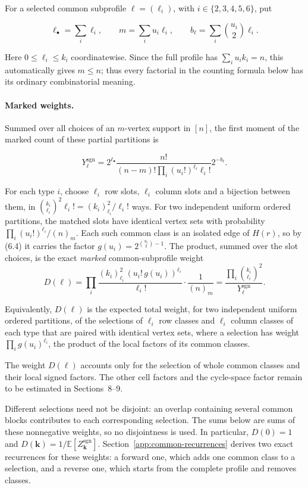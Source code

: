 \documentclass[a4paper,10pt,reqno]{amsart}
\numberwithin{equation}{section}
\newcommand{\Exp}[1]{\mathbb{E}\!\left[#1\right]}
\theoremstyle{plain}
\theoremstyle{remark}
\begin{document}
For a selected common subprofile \(\ell=(\ell_i)\), with
$i\in\{2,3,4,5,6\}$, put

\[
 \ell_\bullet=\sum_i\ell_i,\qquad
 m=\sum_i u_i\ell_i,\qquad
 b_\ell=\sum_i\binom{u_i}{2}\ell_i.                           \tag{7.1}
\]

Here \(0\le\ell_i\le k_i\) coordinatewise.  Since the full profile has
\(\sum_i u_i k_i=n\), this automatically gives \(m\le n\); thus every
factorial in the counting formula below has its ordinary combinatorial
meaning.

\paragraph{Marked weights.}
Summed over all choices of an $m$-vertex support in $[n]$, the first moment of the marked count of these partial partitions is

\[
 Y_{\ell}^{\mathrm{sgn}}
 =2^{\ell_\bullet}\frac{n!}{(n-m)!\prod_i(u_i!)^{\ell_i}\ell_i!}
       2^{-b_\ell}.                                           \tag{7.2}
\]

For each type $i$, choose $\ell_i$ row slots, $\ell_i$ column slots and a
bijection between them, in
$\binom{k_i}{\ell_i}^2\ell_i!=(k_i)_{\ell_i}^2/\ell_i!$ ways. For two
independent uniform ordered partitions, the matched slots have identical
vertex sets with probability $\prod_i(u_i!)^{\ell_i}/(n)_m$. Each such
common class is an isolated edge of $H(r)$, so by (6.4) it carries the
factor $g(u_i)=2^{\binom{u_i}2-1}$. The product, summed over the slot
choices, is the exact \emph{marked} common-subprofile weight
\[
 D(\ell)=\prod_i\frac{(k_i)_{\ell_i}^2\,(u_i!\,g(u_i))^{\ell_i}}{\ell_i!}
   \cdot\frac1{(n)_m}
 =\frac{\prod_i\binom{k_i}{\ell_i}^2}{Y_\ell^{\mathrm{sgn}}}.          \tag{7.3}\label{eq:marked-common-subprofile-weight}
\]

Equivalently, $D(\ell)$ is the expected total weight, for two independent
uniform ordered partitions, of the selections of $\ell_i$ row classes and
$\ell_i$ column classes of each type that are paired with identical vertex
sets, where a selection has weight $\prod_ig(u_i)^{\ell_i}$, the product of
the local factors of its common classes.

The weight $D(\ell)$ accounts only for the selection of whole common
classes and their local signed factors. The other cell factors and the
cycle-space factor remain to be estimated in Sections~8--9.

Different selections need not be disjoint: an overlap containing several
common blocks contributes to each corresponding selection. The sums below
are sums of these nonnegative weights, so no disjointness is used.
In particular,
\(D(0)=1\) and \(D(\mathbf k)=1/\Exp{Z_{\mathbf k}^{\mathrm{sgn}}}\).
Section~\ref{app:common-recurrences} derives two exact recurrences for these
weights: a forward one, which adds one common class to a selection, and a
reverse one, which starts from the complete profile and removes classes.
\end{document}
